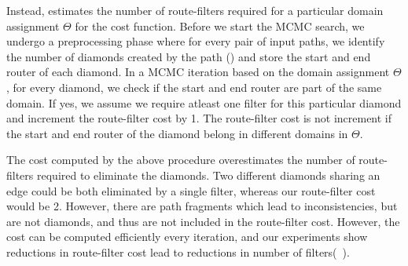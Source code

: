 Instead, \name estimates the number of route-filters required for a 
particular domain assignment $\Theta$ for the cost function. Before 
we start the MCMC search, we undergo a preprocessing phase 
where for every pair of input paths, we identify the
number of diamonds created by the path () and store the start and end router of 
each diamond. In a MCMC iteration based on the domain
assignment $\Theta$, for every diamond, we check if the
start and end router are part of the same domain. If yes, 
we assume we require atleast one filter for this particular
diamond and increment the route-filter cost by 1. The 
route-filter cost is not increment if the start and end 
router of the diamond belong in different domains in $\Theta$.

The cost computed by the above procedure overestimates the
number of route-filters required to eliminate the diamonds.  
Two different diamonds sharing an edge could be both 
eliminated by a single filter, whereas our route-filter cost 
would be 2. However, there are path fragments which 
lead to inconsistencies, but are not diamonds, and thus
are not included in the route-filter cost. However, the 
cost can be computed efficiently every iteration, and 
our experiments show reductions in route-filter cost 
lead to reductions in number of filters(~). 







